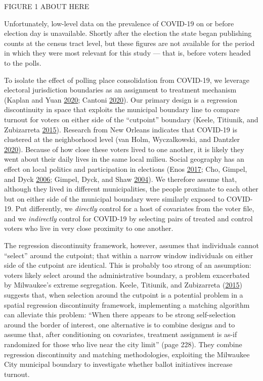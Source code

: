 \documentclass[
  12pt,
]{article}
\begin{document}
FIGURE 1 ABOUT HERE

Unfortunately, low-level data on the prevalence of COVID-19 on or before election day is unavailable. Shortly after the election the state began publishing counts at the census tract level, but these figures are not available for the period in which they were most relevant for this study --- that is, before voters headed to the polls.

To isolate the effect of polling place consolidation from COVID-19, we leverage electoral jurisdiction boundaries as an assignment to treatment mechanism (Kaplan and Yuan \protect\hyperlink{ref-Kaplan2020}{2020}; Cantoni \protect\hyperlink{ref-Cantoni2020}{2020}). Our primary design is a regression discontinuity in space that exploits the municipal boundary line to compare turnout for voters on either side of the ``cutpoint'' boundary (Keele, Titiunik, and Zubizarreta \protect\hyperlink{ref-Keele2015}{2015}). Research from New Orleans indicates that COVID-19 is clustered at the neighborhood level (van Holm, Wyczalkowski, and Dantzler \protect\hyperlink{ref-vanHolm2020}{2020}). Because of how close these voters lived to one another, it is likely they went about their daily lives in the same local milieu. Social geography has an effect on local politics and participation in elections (Enos \protect\hyperlink{ref-Enos2017}{2017}; Cho, Gimpel, and Dyck \protect\hyperlink{ref-Cho2006}{2006}; Gimpel, Dyck, and Shaw \protect\hyperlink{ref-Gimpel2004}{2004}). We therefore assume that, although they lived in different municipalities, the people proximate to each other but on either side of the municipal boundary were similarly exposed to COVID-19. Put differently, we \emph{directly} control for a host of covariates from the voter file, and we \emph{indirectly} control for COVID-19 by selecting pairs of treated and control voters who live in very close proximity to one another.

The regression discontinuity framework, however, assumes that individuals cannot ``select'' around the cutpoint; that within a narrow window individuals on either side of the cutpoint are identical. This is probably too strong of an assumption: voters likely select around the administrative boundary, a problem exacerbated by Milwaukee's extreme segregation. Keele, Titiunik, and Zubizarreta (\protect\hyperlink{ref-Keele2015}{2015}) suggests that, when selection around the cutpoint is a potential problem in a spatial regression discontinuity framework, implementing a matching algorithm can alleviate this problem: ``When there appears to be strong self-selection around the border of interest, one alternative is to combine designs and to assume that, after conditioning on covariates, treatment assignment is as-if randomized for those who live near the city limit'' (page 228). They combine regression discontinuity and matching methodologies, exploiting the Milwaukee City municipal boundary to investigate whether ballot initiatives increase turnout.
\end{document}
